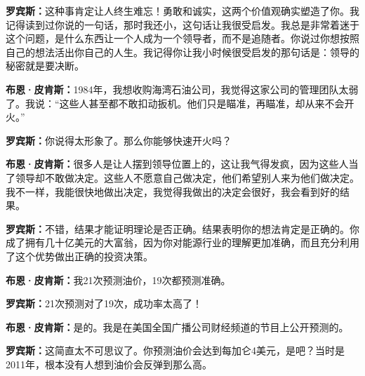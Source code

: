 \begin{BookQuote}
\textbf{罗宾斯：}这种事肯定让人终生难忘！勇敢和诚实，这两个价值观确实塑造了你。我记得读到过你说的一句话，那时我还小，这句话让我很受启发。我总是非常着迷于这个问题，是什么东西让一个人成为一个领导者，而不是追随者。你说过你想按照自己的想法活出你自己的人生。我记得你让我小时候很受启发的那句话是：领导的秘密就是要决断。
\end{BookQuote}

\begin{BookQuote}
\textbf{布恩·皮肯斯：}1984年，我想收购海湾石油公司，我觉得这家公司的管理团队太弱了。我说：“这些人甚至都不敢扣动扳机。他们只是瞄准，再瞄准，却从来不会开火。”
\end{BookQuote}

\begin{BookQuote}
\textbf{罗宾斯：}你说得太形象了。那么你能够快速开火吗？
\end{BookQuote}

\begin{BookQuote}
\textbf{布恩·皮肯斯：}很多人是让人摆到领导位置上的，这让我气得发疯，因为这些人当了领导却不敢做决定。这些人不愿意自己做决定，他们希望别人来为他们做决定。我不一样，我能很快地做出决定，我觉得我做出的决定会很好，我会看到好的结果。
\end{BookQuote}

\begin{BookQuote}
\textbf{罗宾斯：}不错，结果才能证明理论是否正确。结果表明你的想法肯定是正确的。你成了拥有几十亿美元的大富翁，因为你对能源行业的理解更加准确，而且充分利用了这个优势做出正确的投资决策。
\end{BookQuote}

\begin{BookQuote}
\textbf{布恩·皮肯斯：}我21次预测油价，19次都预测准确。
\end{BookQuote}

\begin{BookQuote}
\textbf{罗宾斯：}21次预测对了19次，成功率太高了！
\end{BookQuote}

\begin{BookQuote}
\textbf{布恩·皮肯斯：}是的。我是在美国全国广播公司财经频道的节目上公开预测的。
\end{BookQuote}

\begin{BookQuote}
\textbf{罗宾斯：}这简直太不可思议了。你预测油价会达到每加仑4美元，是吧？当时是2011年，根本没有人想到油价会反弹到那么高。
\end{BookQuote}

